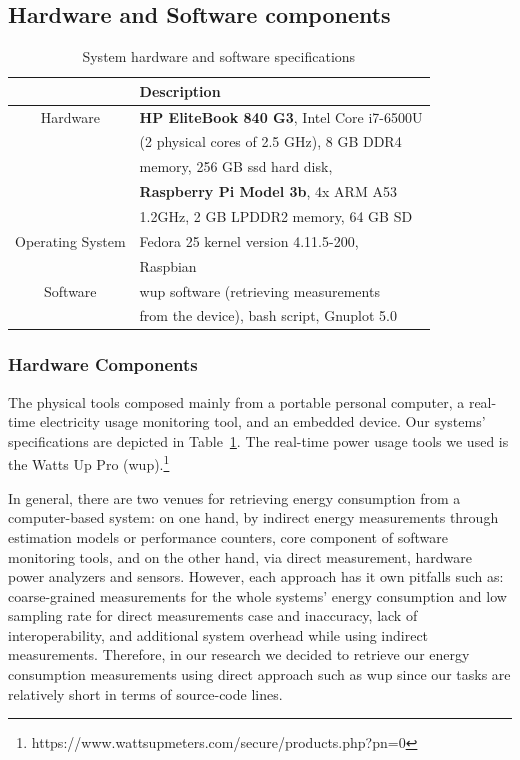 \subsection{Hardware and Software components}

\begin{table}
	\begin{threeparttable}
		\caption{System hardware and software specifications}
		\label{laptop_specs}
		\begin{tabular}{cl}
			\toprule
			&Description\\
			\midrule
			Hardware	& \textbf{HP EliteBook 840 G3}, Intel Core i7-6500U \\
			& (2 physical cores of 2.5 GHz), 8 GB DDR4  \\
			& memory, 256 GB {\sc ssd}  hard disk, \\
			& \textbf{Raspberry Pi Model 3b}, 4x ARM A53 \\
			& 1.2GHz, 2 GB LPDDR2 memory, 64 GB SD\\
			Operating  System & Fedora 25 kernel version 4.11.5-200,  \\
			& Raspbian\\	
			Software 	& {\sc wup} software (retrieving measurements \\
			& from the device), bash script, Gnuplot 5.0 \\
			\bottomrule
		\end{tabular}
	\end{threeparttable}
\end{table}


\subsubsection{Hardware Components}
The physical tools composed mainly from a portable personal 
computer, a real-time electricity usage monitoring tool, and 
an embedded device.
Our systems' specifications are depicted in Table~\ref{laptop_specs}. 
The real-time power usage tools we used is the Watts Up Pro ({\sc wup}).\footnote{https://www.wattsupmeters.com/secure/products.php?pn=0} 

In general, there are two venues for retrieving energy consumption 
from a computer-based system: on one hand, by indirect energy measurements 
through estimation models or performance counters, core component 
of software monitoring tools, and on the other hand, via direct measurement, 
hardware power analyzers and sensors.  
However, each approach has it own pitfalls such as: coarse-grained 
measurements for the whole systems' energy consumption and low sampling 
rate for direct measurements case and inaccuracy, lack of interoperability, 
and additional system overhead while using indirect measurements. 
Therefore, in our research we decided to retrieve our energy consumption 
measurements using direct approach such as {\sc wup} since our 
tasks are relatively short in terms of source-code lines.

